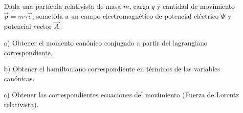 Dada  una  partícula  relativista  de  masa $m$,  carga $q$ y  cantidad  de  movimiento $\vec{p}=m\gamma \vec{v}$, sometida  a un campo electromagnético de potencial eléctrico $\Phi$ y potencial vector $\vec{A}$:  

a) Obtener el momento canónico conjugado a partir del lagrangiano correspondiente.  

b) Obtener el hamiltoniano correspondiente en términos de  las  variables  canónicas.

c) Obtener  las  correspondientes  ecuaciones  del  movimiento  (Fuerza  de  Lorentz relativista).

\begin{solution}

\end{solution}